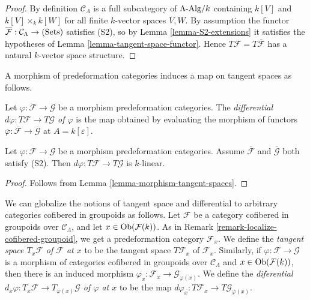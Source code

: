 \begin{proof}
By definition $\mathcal C_{\Lambda}$ is a full subcategory of 
$\Lambda\textnormal{-Alg}/k$ containing $k[V]$ and $k[V] \times_{k} k[W]$ for 
all finite $k$-vector spaces $V,W$.  By assumption the functor 
$\overline{\mathcal F}: \mathcal C_{\Lambda} \rightarrow \textnormal{(Sets)}$ 
satisfies (S2), so by Lemma \ref{lemma-S2-extensions} it satisfies the 
hypotheses of Lemma \ref{lemma-tangent-space-functor}.  Hence $T \mathcal F = T 
\overline{\mathcal F}$ has a natural $k$-vector space structure.
\end{proof}

\noindent
A morphism of predeformation categories induces a map on tangent spaces as 
follows.

\begin{definition}
\label{definition-differential}
Let $\varphi: \mathcal F \rightarrow \mathcal G$ be a morphism predeformation 
categories. The {\it differential $d \varphi: T \mathcal F \rightarrow T 
\mathcal G$ of $\varphi$} is the map obtained by evaluating the morphism of 
functors $\overline{\varphi}: \overline{\mathcal F} \rightarrow  
\overline{\mathcal G}$ at $A = k[\varepsilon]$.
\end{definition}

\begin{lemma}
\label{lemma-k-linear-differential}
Let $\varphi: \mathcal F \rightarrow \mathcal G$ be a morphism predeformation 
categories. Assume $\overline{\mathcal F}$ and $\overline{\mathcal G}$ both 
satisfy \textnormal{(S2)}.  Then $d \varphi: T \mathcal F \rightarrow T 
\mathcal G$ is $k$-linear.
\end{lemma}

\begin{proof}
Follows from Lemma \ref{lemma-morphism-tangent-spaces}.
\end{proof}

\begin{remark}
\label{remark-tangent-space-cofibered-groupoid}
We can globalize the notions of tangent space and differential to arbitrary 
categories cofibered in groupoids as follows. Let $\mathcal F$ be a category 
cofibered in groupoids over $\mathcal C_{\Lambda}$, and let $x \in 
\textnormal{Ob}(\mathcal F(k))$.  As in Remark 
\ref{remark-localize-cofibered-groupoid}, we get a predeformation category 
$\mathcal F_x$.  We define the {\it tangent space $T_x \mathcal F$ of 
$\mathcal F$ at $x$} to be the tangent space $T \mathcal F_x$ of $\mathcal 
F_x$.  Similarly, if $\varphi: \mathcal F \rightarrow \mathcal G$ is a morphism 
of categories cofibered in groupoids over $\mathcal C_{\Lambda}$ and $x \in 
\textnormal{Ob}(\mathcal F(k))$, then there is an induced morphism $\varphi_x: 
\mathcal F_x \rightarrow \mathcal G_{\varphi(x)}$.  We define the 
{\it diferential $d_{x} \varphi: T_{x} \mathcal F \rightarrow T_{\varphi(x)} 
\mathcal G$ of $\varphi$ at $x$} to be the map $d \varphi_x: T \mathcal F_x 
\rightarrow T \mathcal G_{\varphi(x)}$.
\end{remark}



